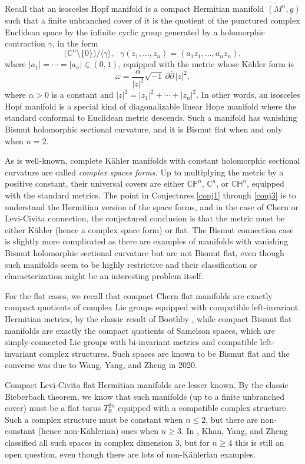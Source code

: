 \documentclass{amsart}
\numberwithin{equation}{section}
\begin{document}
Recall that an isosceles Hopf manifold is a compact Hermitian manifold $(M^n,g)$ such that a finite unbranched cover of it is the quotient of the punctured complex Euclidean space by the infinite cyclic group generated by a holomorphic contraction $\gamma$, in the form
$$ \big({\mathbb C}^n\setminus \{0\}\big)/ \langle \gamma \rangle , \ \ \ \gamma(z_1,  \ldots , z_n) = (a_1z_1,  \ldots , a_nz_n), $$
where $|a_1|= \cdots = |a_n| \in (0,1)$, equipped with the metric whose K\"ahler form is
$$\omega = \frac{\alpha }{|z|^2} \sqrt{-1} \,\partial \overline{\partial} \,|z|^2, $$
where $\alpha >0$ is a constant and $|z|^2 = |z_1|^2 + \cdots + |z_n|^2$. In other words, an isosceles Hopf manifold is a special kind of diagonalizable linear Hope manifold where the standard conformal to Euclidean metric descends. Such a manifold has vanishing Bismut holomorphic sectional curvature, and it is Bismut flat when and only when $n=2$.

As is well-known, complete K\"ahler manifolds with constant holomorphic sectional curvature are called {\em complex spaces forms.} Up to multiplying the metric by a positive constant, their universal covers are either ${\mathbb C}{\mathbb P}^n$, ${\mathbb C}^n$, or ${\mathbb C}{\mathbb H}^n$, equipped with the standard metrics. The point in Conjectures \ref{conj1} through \ref{conj3} is to understand the Hermitian version of the space forms, and in the case of Chern or Levi-Civita connection, the conjectured conclusion is that the metric must be either K\"ahler (hence a complex space form) or flat. The Bismut connection case is slightly more complicated as there are examples of manifolds with vanishing Bismut holomorphic sectional curvature but are not Bismut flat, even though such manifolds seem to be highly restrictive and their classification or characterization might be an interesting problem itself.

For the flat cases, we recall that compact Chern flat manifolds are exactly compact quotients of complex Lie groups equipped with compatible left-invariant Hermitian metrics, by the classic result of Boothby \cite{Boothby}, while compact Bismut flat manifolds are exactly the compact quotients of Samelson spaces, which are simply-connected Lie groups with bi-invariant metrics and compatible left-invariant complex structures. Such spaces are known to be Bismut flat \cite{Pittie} and the converse was due to Wang, Yang, and Zheng \cite{WYZ} in 2020.

Compact Levi-Civita flat Hermitian manifolds are lesser known. By the classic Bieberbach theorem, we know that such manifolds (up to a finite unbranched cover) must be a flat torus $T^{2n}_{\mathbb R}$ equipped with a compatible complex structure. Such a complex structure must be constant when $n\leq 2$, but there are non-constant (hence non-K\"ahlerian) ones when $n\geq 3$. In \cite{KYZ}, Khan, Yang, and Zheng classified all such spaces in complex dimension $3$, but for $n\geq 4$ this is still an open question, even though there are lots of non-K\"ahlerian examples.
\end{document}
